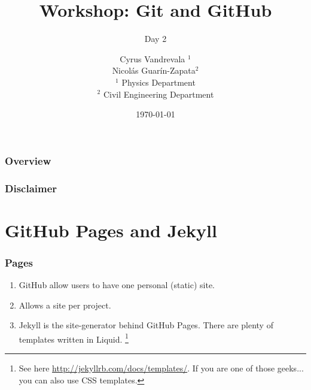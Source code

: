 


\title{Workshop: Git and GitHub}
\subtitle{Day 2}
\author[AUTHOR]{\scriptsize{Cyrus Vandrevala $^1$\\Nicol\'as Guar\'in-Zapata$^2$}\\
\tiny{$^1$ Physics Department\\ $^2$ Civil Engineering Department}}
\date{\today}




\begin{frame}[plain]
 \titlepage
\end{frame}

\begin{frame}
    \frametitle{\large{Overview}}
    \tableofcontents
\end{frame}


\begin{frame}
    \frametitle{Disclaimer}
\end{frame}


\section[GitHub Pages]{GitHub Pages and Jekyll}

\begin{frame}
    \frametitle{Pages}
    
    \begin{enumerate}
    \item GitHub allow users to have one personal (static) site. \pause
    
    \item Allows a site per project. \pause
    
    \item Jekyll is the site-generator behind GitHub Pages. There are plenty of templates written in Liquid. \footnote{See here \url{http://jekyllrb.com/docs/templates/}. If you are one of those geeks... you can also use CSS templates.}

    \end{enumerate}
\end{frame}
      


